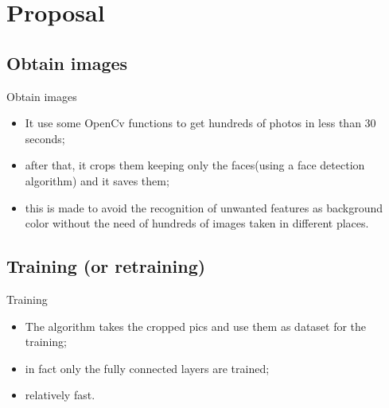 \documentclass{beamer}
\begin{document}
\section{Proposal}

\subsection{Obtain images}

\begin{frame}{Obtain images}
	\begin{itemize}
		\setlength\itemsep{1em}
		[triangle]

			\item 
				It use some OpenCv functions to get hundreds of photos in less than 30 seconds;
			\item 
				after that, it crops them keeping only the faces(using a face detection algorithm) and it saves them;
			\item
				this is made to avoid the recognition of unwanted features as background color without 							the need of hundreds of images taken in different places.
		
	\end{itemize}
\end{frame}

\subsection{Training (or retraining)}

\begin{frame}{Training}
\begin{itemize}
		\setlength\itemsep{1em}
		[triangle]
		
			\item 
				The algorithm takes the cropped pics and use them as dataset for the training;
			\item 
				in fact only the fully connected layers are trained;
			\item
				relatively fast.
		
	\end{itemize}
\end{frame}
\end{document}
